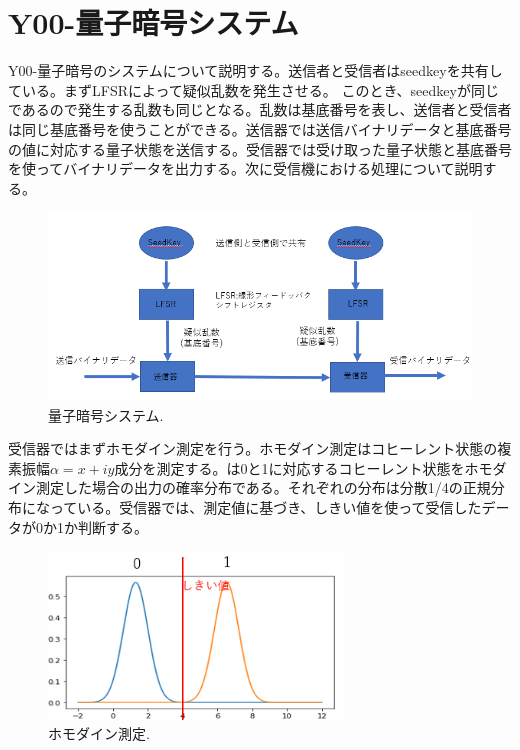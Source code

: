\chapter{Y00-量子暗号システム}
Y00-量子暗号のシステムについて説明する。送信者と受信者はseedkeyを共有している。まずLFSRによって疑似乱数を発生させる。
このとき、seedkeyが同じであるので発生する乱数も同じとなる。乱数は基底番号を表し、送信者と受信者は同じ基底番号を使うことができる。送信器では送信バイナリデータと基底番号の値に対応する量子状態を送信する。受信器では受け取った量子状態と基底番号を使ってバイナリデータを出力する。次に受信機における処理について説明する。

\begin{figure}[htbp]
        \centering   
        \includegraphics[width=1.0\textwidth]{img/zemi3.png}
        \caption[sample image (png)]{量子暗号システム.}
        \label{fig:4_1}
    \end{figure}



受信器ではまずホモダイン測定を行う。ホモダイン測定はコヒーレント状態の複素振幅$\alpha=x+iy$成分を測定する。は0と1に対応するコヒーレント状態をホモダイン測定した場合の出力の確率分布である。それぞれの分布は分散1/4の正規分布になっている。受信器では、測定値に基づき、しきい値を使って受信したデータが0か1か判断する。

\begin{figure}[htbp]
        \centering   
        \includegraphics[width=0.7\textwidth]{img/zemi4}
        \caption[sample image (png)]{ホモダイン測定.}
        \label{Fig:4_2}
    \end{figure}
    
